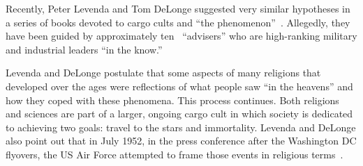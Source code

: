 Recently, Peter Levenda and Tom DeLonge suggested very similar hypotheses in a series of books devoted to cargo cults and ``the phenomenon''~\cite{DeLongeLevenda-Gods,DeLongeLevenda-Men}. Allegedly, they have been guided by approximately ten~\cite{Iandoli2023Feb} ``advisers'' who are high-ranking military and industrial leaders ``in the know.''

Levenda and DeLonge postulate that some aspects of many religions that developed over the ages were reflections of what people saw ``in the heavens'' and how they coped with these phenomena. This process continues. Both religions and sciences are part of a larger, ongoing cargo cult in which society is dedicated to achieving two goals: travel to the stars and immortality. Levenda and DeLonge also point out that in July 1952, in the press conference after the Washington DC flyovers, the US Air Force attempted to frame those events in religious terms~\cite[Footnote~100]{DeLongeLevenda-Men}.
